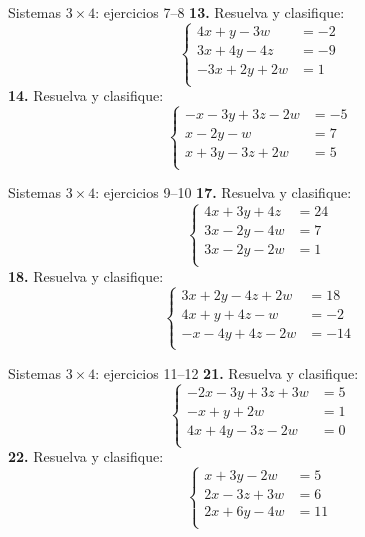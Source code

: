 \documentclass[aspectratio=169]{beamer}
\begin{document}
\begin{frame}{Sistemas $3\times 4$: ejercicios 7--8}
\small
\textbf{13.} Resuelva y clasifique:
\[\left\{\begin{aligned}
4x+y-3w&=-2\\
3x+4y-4z&=-9\\
-3x+2y+2w&=1\\
\end{aligned}\right.\]
\textbf{14.} Resuelva y clasifique:
\[\left\{\begin{aligned}
-x-3y+3z-2w&=-5\\
x-2y-w&=7\\
x+3y-3z+2w&=5\\
\end{aligned}\right.\]
\end{frame}
\begin{frame}{Sistemas $3\times 4$: ejercicios 9--10}
\small
\textbf{17.} Resuelva y clasifique:
\[\left\{\begin{aligned}
4x+3y+4z&=24\\
3x-2y-4w&=7\\
3x-2y-2w&=1\\
\end{aligned}\right.\]
\textbf{18.} Resuelva y clasifique:
\[\left\{\begin{aligned}
3x+2y-4z+2w&=18\\
4x+y+4z-w&=-2\\
-x-4y+4z-2w&=-14\\
\end{aligned}\right.\]
\end{frame}
\begin{frame}{Sistemas $3\times 4$: ejercicios 11--12}
\small
\textbf{21.} Resuelva y clasifique:
\[\left\{\begin{aligned}
-2x-3y+3z+3w&=5\\
-x+y+2w&=1\\
4x+4y-3z-2w&=0\\
\end{aligned}\right.\]
\textbf{22.} Resuelva y clasifique:
\[\left\{\begin{aligned}
x+3y-2w&=5\\
2x-3z+3w&=6\\
2x+6y-4w&=11\\
\end{aligned}\right.\]
\end{frame}
\end{document}

